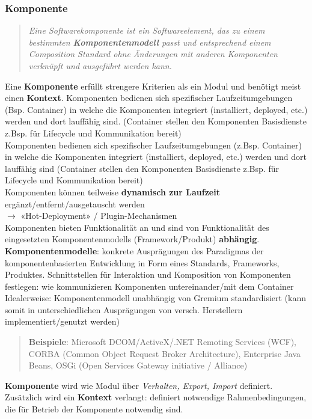 \documentclass[a4paper]{article}
\begin{document}
	\subsubsection{Komponente}
	\begin{quote}
		\textit{Eine Softwarekomponente ist ein Softwareelement, das zu einem
bestimmten \textbf{Komponentenmodell} passt und entsprechend
einem Composition Standard ohne Änderungen mit anderen
Komponenten verknüpft und ausgeführt werden kann.}
	\end{quote}
	Eine \textbf{Komponente} erfüllt strengere Kriterien als ein Modul und benötigt meist einen \textbf{Kontext}. Komponenten bedienen sich spezifischer Laufzeitumgebungen (Bsp. Container) in welche die Komponenten integriert (installiert, deployed, etc.) werden und dort lauffähig sind. (Container stellen den Komponenten Basisdienste z.Bsp. für Lifecycle und Kommunikation bereit)\\
	Komponenten bedienen sich spezifischer Laufzeitumgebungen (z.Bsp. Container) in welche die Komponenten integriert (installiert, deployed, etc.) werden und dort lauffähig sind (Container stellen den Komponenten Basisdienste z.Bsp. für Lifecycle und Kommunikation bereit)\\
	Komponenten können teilweise \textbf{dynamisch zur Laufzeit} ergänzt/entfernt/ausgetauscht werden
	\\ \indent $\rightarrow$ «Hot-Deployment» / Plugin-Mechanismen\\
	Komponenten bieten Funktionalität an und sind von Funktionalität des eingesetzten Komponentenmodells (Framework/Produkt) \textbf{abhängig}.\\
	\newline
	\textbf{Komponentenmodelle}: konkrete Ausprägungen des Paradigmas der komponentenbasierten Entwicklung in Form eines Standards, Frameworks, Produktes. Schnittstellen für Interaktion und Komposition von Komponenten festlegen: wie kommunizieren Komponenten untereinander/mit dem Container Idealerweise: Komponentenmodell unabhängig von Gremium standardisiert (kann somit in unterschiedlichen Ausprägungen von versch. Herstellern implementiert/genutzt werden)
	\begin{quote}
			\textbf{Beispiele}: Microsoft DCOM/ActiveX/.NET Remoting Services (WCF), CORBA (Common Object Request Broker Architecture), Enterprise Java Beans, OSGi (Open Services Gateway initiative / Alliance)
	\end{quote}
	\textbf{Komponente} wird wie Modul über \textit{Verhalten, Export, Import} definiert. \\
	Zusätzlich wird ein \textbf{Kontext} verlangt: definiert notwendige Rahmenbedingungen, die für Betrieb der Komponente notwendig sind.
	
\end{document}

